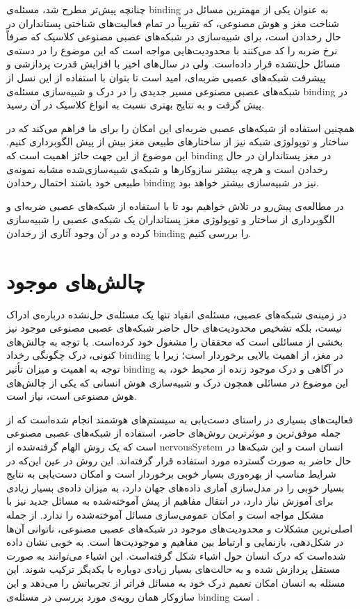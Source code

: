 \documentclass[12pt]{report}
\begin{document}
چنانچه پیش‌تر مطرح شد، مسئله‌ی \gls{binding} به عنوان یکی از مهمترین مسائل در شناخت مغز و هوش مصنوعی، که تقریباً در تمام فعالیت‌های شناختی پستانداران در حال رخدادن است، برای شبیه‌سازی در شبکه‌های عصبی مصنوعی کلاسیک که صرفاً نرخ ضربه را کد می‌کنند با محدودیت‌هایی مواجه است \cite{vonderMalsburg1999} که این موضوع را در دسته‌ی مسائل حل‌نشده قرار داده‌است. ولی در سال‌های اخیر با افزایش قدرت پردازشی و پیشرفت شبکه‌های عصبی ضربه‌ای‌، امید است تا بتوان با استفاده از این نسل از شبکه‌های عصبی مصنوعی مسیر جدیدی را در درک و شبیه‌سازی مسئله‌ی \gls{binding} در پیش گرفت و به نتایج بهتری نسبت به انواع کلاسیک در آن رسید.

همچنین استفاده از شبکه‌های عصبی ضربه‌ای این امکان را برای ما فراهم می‌کند که در ساختار و توپولوژی شبکه نیز از ساختار‌های طبیعی مغز بیش از پیش الگوبرداری کنیم. این موضوع از این جهت  حائز اهمیت است که \gls{binding} در مغز پستانداران در حال رخدادن است و هرچه بیشتر سازوکارها و شبکه‌ی شبیه‌سازی‌شده مشابه نمونه‌ی طبیعی خود باشند احتمال رخدادن \gls{binding} نیز در شبیه‌سازی بیشتر خواهد بود.

در مطالعه‌ی پیش‌رو در تلاش خواهیم بود تا با استفاده از شبکه‌های عصبی ضربه‌ای و الگوبرداری از ساختار و توپولوژی مغز پستانداران یک شبکه‌ی عصبی را شبیه‌سازی کرده و در آن وجود آثاری از رخدادن \gls{binding} را بررسی کنیم.


	
	\section{چالش‌های موجود}
	در زمینه‌ی شبکه‌های عصبی، مسئله‌ی انقیاد تنها یک مسئله‌ی حل‌نشده درباره‌ی ادراک نیست، بلکه تشخیص محدودیت‌های حال حاضر شبکه‌های عصبی مصنوعی موجود نیز بخشی از مسائلی است که محققان را مشغول خود کرده‌است.
	با توجه به چالش‌های کنونی، درک چگونگی رخداد \gls{binding} در مغز، از اهمیت بالایی برخوردار است؛ زیرا با توجه به اهمیت و میزان تأثیر \gls{binding} در آگاهی و درک موجود زنده از محیط خود، به این موضوع در مسائلی همچون درک و شبیه‌سازی هوش انسانی که یکی از چالش‌های هوش مصنوعی است، نیاز است.
	
	 فعالیت‌های بسیاری در راستای دست‌یابی به سیستم‌های هوشمند انجام شده‌است که از جمله‌ موفق‌ترین و موثر‌ترین روش‌های حاضر، استفاده از شبکه‌های عصبی مصنوعی است که یک روش الهام گرفته‌شده از \gls{nervousSystem} انسان است و این شبکه‌ها در حال حاضر به صورت گسترده مورد استفاده قرار گرفته‌اند. این روش در  عین این‌که در شرایط مناسب از بهره‌وری بسیار خوبی برخوردار است و امکان دست‌یابی به نتایج بسیار خوبی را در مدل‌سازی آماری داده‌های جهان دارد، به میزان داده‌ی بسیار زیادی برای آموزش نیاز دارد، در انتقال مفاهیم از پیش آموخته‌شده به مسائل جدید نیز با مشکل مواجه است و امکان عمومی‌سازی مسائل آموخته‌شده را ندارد.
	از جمله اصلی‌ترین مشکلات و محدودیت‌های موجود در شبکه‌های عصبی مصنوعی، ناتوانی آن‌ها در شکل‌دهی، بازنمایی و ارتباط بین مفاهیم و موجودیت‌ها است. به خوبی نشان داده شده‌است که درک انسان حول اشیاء شکل گرفته‌است. این اشیاء می‌توانند به صورت مستقل پردازش شده و به حالت‌های بسیار زیادی دوباره با یکدیگر ترکیب شوند. این مسئله به انسان امکان تعمیم درک خود به مسائل فراتر از تجربیاتش را می‌دهد و این ساز‌وکار همان رویه‌ی مورد بررسی در مسئله‌ی \gls{binding} است
	\cite{greff2020binding}.
	
\end{document}
